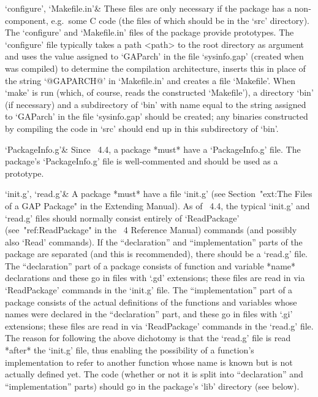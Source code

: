 `configure', `Makefile.in'&
These files are only necessary if the package has a non-{\GAP} component,
e.g.~some C code (the files of which should be in the  `src'  directory).
The `configure' and `Makefile.in' files of the {\Example} package provide
prototypes. The `configure' file typically takes a  path  <path>  to  the
{\GAP} root  directory  as  argument  and  uses  the  value  assigned  to
`GAParch' in the file `sysinfo.gap' (created when {\GAP} was compiled) to
determine the compilation architecture, inserts  this  in  place  of  the
string `@GAPARCH@' in `Makefile.in' and creates a file  `Makefile'.  When
`make' is run (which, of course, reads  the  constructed  `Makefile'),  a
directory `bin' (if necessary) and a  subdirectory  of  `bin'  with  name
equal to the string assigned  to  `GAParch'  in  the  file  `sysinfo.gap'
should be created; any binaries constructed  by  compiling  the  code  in
`src' should end up in this subdirectory of `bin'.

`PackageInfo.g'&
Since {\GAP}~4.4, a {\GAP} package *must* have  a  `PackageInfo.g'  file.
The {\Example}  package's  `PackageInfo.g'  file  is  well-commented  and
should be used as a prototype.

`init.g', `read.g'&
A {\GAP} package *must* have a file `init.g' (see Section~"ext:The  Files
of a GAP Package" in the Extending {\GAP} Manual). As of {\GAP}~4.4,  the
typical `init.g' and `read.g' files should normally consist  entirely  of
`ReadPackage' (see~"ref:ReadPackage" in the  {\GAP}~4  Reference  Manual)
commands (and possibly also `Read' commands). If the ``declaration''  and
``implementation'' parts of  the  package  are  separated  (and  this  is
recommended), there should be a `read.g' file. The  ``declaration''  part
of a package consists of function and variable  *name*  declarations  and
these go in files with `.gd' extensions; these  files  are  read  in  via
`ReadPackage' commands in the `init.g' file. The ``implementation''  part
of a package consists of the actual  definitions  of  the  functions  and
variables whose names were declared  in  the  ``declaration''  part,  and
these go in files with `.gi' extensions; these  files  are  read  in  via
`ReadPackage' commands in the `read.g' file. The reason for following the
above dichotomy is that the `read.g' file is read  *after*  the  `init.g'
file, thus enabling the possibility of  a  function's  implementation  to
refer to another function whose name is known but is not actually defined
yet. The {\GAP} code (whether or not it is split into ``declaration'' and
``implementation'' parts) should go in the package's `lib' directory (see
below).


